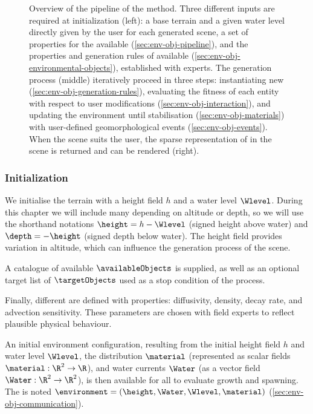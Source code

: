 \begin{figure}[H]
    \caption{Overview of the pipeline of the method. Three different inputs are required at initialization (left): a base terrain and a given water level directly given by the user for each generated scene, a set of properties for the  available (\cref{sec:env-obj-pipeline}), and the properties and generation rules of  available (\cref{sec:env-obj-environmental-objects}), established with experts. The generation process (middle) iteratively proceed in three steps: instantiating new  (\cref{sec:env-obj-generation-rules}), evaluating the fitness of each entity with respect to user modifications (\cref{sec:env-obj-interaction}), and updating the environment until stabilisation (\cref{sec:env-obj-materials}) with user-defined geomorphological events (\cref{sec:env-obj-events}). When the scene suits the user, the sparse representation of  in the scene is returned and can be rendered (right). }
    \label{fig:env-obj-pipeline}
\end{figure}

\subsubsection{Initialization}

We initialise the terrain with a height field $h$ and a water level $\Wlevel$. During this chapter we will include many  depending on altitude or depth, so we will use the shorthand notations $\height = h-\Wlevel$ (signed height above water) and $\depth=-\height$ (signed depth below water). The height field provides variation in altitude, which can influence the generation process of the scene.

A catalogue of available  $\availableObjects$ is supplied, as well as an optional target list of  $\targetObjects$ used as a stop condition of the process.

Finally, different  are defined with properties: diffusivity, density, decay rate, and advection sensitivity. These parameters are chosen with field experts to reflect plausible physical behaviour.

An initial environment configuration, resulting from the initial height field $h$ and water level $\Wlevel$, the  distribution $\material$ (represented as scalar fields $\material: \R^2 \to \R$), and water currents $\Water$ (as a vector field $\Water: \R^2 \to \R^2$), is then available for all  to evaluate growth and spawning. The  is noted $\environment = (\height, \Water, \Wlevel, \material)$ (\cref{sec:env-obj-communication}).

